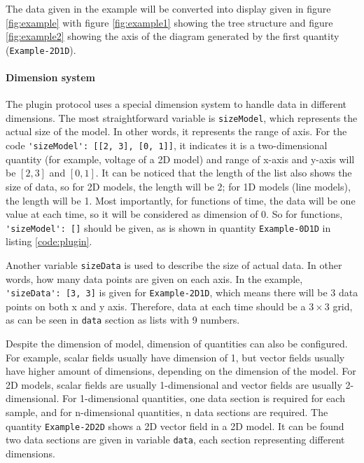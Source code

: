 The data given in the example will be converted into display given in figure \ref{fig:example} with figure \ref{fig:example1} showing the tree structure and figure \ref{fig:example2} showing the axis of the diagram generated by the first quantity (\texttt{Example-2D1D}).

\paragraph{Dimension system}

The plugin protocol uses a special dimension system to handle data in different dimensions. The most straightforward variable is \texttt{sizeModel}, which represents the actual size of the model. In other words, it represents the range of axis. For the code \lstinline{'sizeModel': [[2, 3], [0, 1]]}, it indicates it is a two-dimensional quantity (for example, voltage of a 2D model) and range of x-axis and y-axis will be $[2, 3]$ and $[0, 1]$. It can be noticed that the length of the list also shows the size of data, so for 2D models, the length will be 2; for 1D models (line models), the length will be 1. Most importantly, for functions of time, the data will be one value at each time, so it will be considered as dimension of 0. So for functions, \lstinline{'sizeModel': []} should be given, as is shown in quantity \lstinline{Example-0D1D} in listing \ref{code:plugin}.

Another variable \lstinline{sizeData} is used to describe the size of actual data. In other words, how many data points are given on each axis. In the example, \lstinline{'sizeData': [3, 3]} is given for \lstinline{Example-2D1D}, which means there will be 3 data points on both x and y axis. Therefore, data at each time should be a $3\times3$ grid, as can be seen in \lstinline{data} section as lists with 9 numbers.

Despite the dimension of model, dimension of quantities can also be configured. For example, scalar fields usually have dimension of 1, but vector fields usually have higher amount of dimensions, depending on the dimension of the model. For 2D models, scalar fields are usually 1-dimensional and vector fields are usually 2-dimensional. For 1-dimensional quantities, one data section is required for each sample, and for n-dimensional quantities, n data sections are required. The quantity \lstinline{Example-2D2D} shows a 2D vector field in a 2D model. It can be found two data sections are given in variable \lstinline{data}, each section representing different dimensions.

